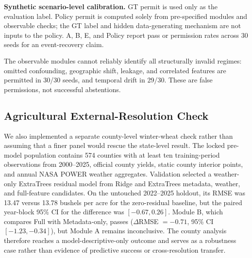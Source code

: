 \documentclass[conference]{IEEEtran}
\begin{document}
\begin{center}
\scriptsize
\textbf{Synthetic scenario-level calibration.} GT permit is used only as the
evaluation label. Policy permit is computed solely from pre-specified modules and
observable checks; the GT label and hidden data-generating mechanism are not
inputs to the policy. A, B, E, and Policy report pass or permission rates across
30 seeds for an event-recovery claim.\par\smallskip

\end{center}
The observable modules cannot reliably identify all structurally invalid regimes:
omitted confounding, geographic shift, leakage, and correlated features are
permitted in 30/30 seeds, and temporal drift in 29/30. These are false
permissions, not successful abstentions.

\subsection{Agricultural External-Resolution Check}
We also implemented a separate county-level winter-wheat check rather than
assuming that a finer panel would rescue the state-level result. The locked
pre-model population contains 574 counties with at least ten training-period
observations from 2000--2025, official county yields, static county interior
points, and annual NASA POWER weather aggregates. Validation selected a
weather-only ExtraTrees residual model from Ridge and ExtraTrees metadata,
weather, and full-feature candidates. On the untouched 2022--2025 holdout, its
RMSE was 13.47 versus 13.78 bushels per acre for the zero-residual baseline, but
the paired year-block 95\% CI for the difference was $[-0.67,0.26]$. Module B,
which compares Full with Metadata-only, passes ($\Delta$RMSE $=-0.71$, 95\% CI
$[-1.23,-0.34]$), but Module A remains inconclusive. The county analysis therefore
reaches a model-descriptive-only outcome and serves as a robustness case rather
than evidence of predictive success or cross-resolution transfer.
\end{document}
